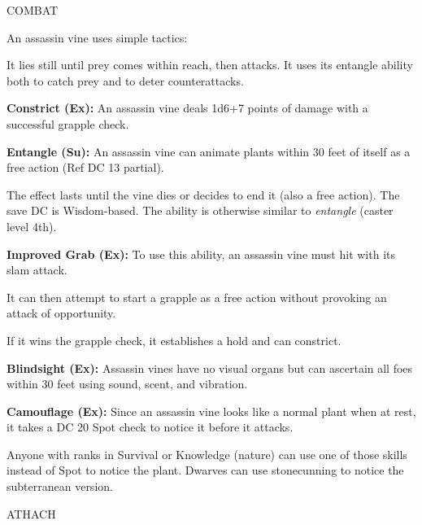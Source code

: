 \documentclass{article}
\begin{document}
COMBAT

An assassin vine uses simple tactics:

It lies still until prey comes within reach, then attacks. It uses its entangle 
ability both to catch prey and to deter counterattacks.

\textbf{Constrict (Ex):} An assassin vine deals 1d6+7 points of damage with a successful 
grapple check.

\textbf{Entangle (Su): }An assassin vine can animate plants within 30 feet of itself 
as a free action (Ref DC 13 partial).

The effect lasts until the vine dies or decides to end it (also a free action). 
The save DC is Wisdom-based. The ability is otherwise similar to \textit{entangle 
}(caster level 4th).

\textbf{Improved Grab (Ex):} To use this ability, an assassin vine must hit with 
its slam attack.

It can then attempt to start a grapple as a free action without provoking an attack 
of opportunity.

If it wins the grapple check, it establishes a hold and can constrict.

\textbf{Blindsight (Ex): }Assassin vines have no visual organs but can ascertain 
all foes within 30 feet using sound, scent, and vibration.

\textbf{Camouflage (Ex):} Since an assassin vine looks like a normal plant when 
at rest, it takes a DC 20 Spot check to notice it before it attacks.

Anyone with ranks in Survival or Knowledge (nature) can use one of those skills 
instead of Spot to notice the plant. Dwarves can use stonecunning to notice the 
subterranean version.

\vspace{12pt}
{\LARGE{}ATHACH}
\end{document}
